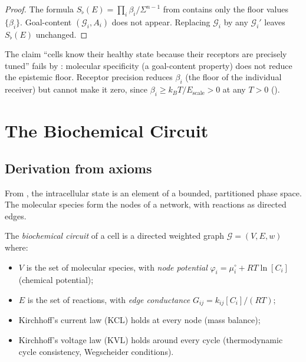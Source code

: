 \documentclass[twocolumn,11pt,a4paper]{article}
\newcommand{\Sfloor}{S_{\flat}}
\newcommand{\Gcond}{\mathcal{G}}
\begin{document}
\begin{proof}
The formula $\Sfloor(E) = \prod_i \beta_i / \Sigma^{n-1}$ from
 contains only the floor values $\{\beta_i\}$.
Goal-content $(\mathcal{G}_i, A_i)$ does not appear. Replacing
$\mathcal{G}_i$ by any $\mathcal{G}_i'$ leaves $\Sfloor(E)$ unchanged.
\end{proof}

\begin{corollary}\label{cor:no-specificity}
The claim ``cells know their healthy state because their receptors are
precisely tuned'' fails by : molecular specificity (a
goal-content property) does not reduce the epistemic floor. Receptor
precision reduces $\beta_i$ (the floor of the individual receiver) but
cannot make it zero, since $\beta_i \geq k_BT / E_{\mathrm{scale}} > 0$
at any $T > 0$ ().
\end{corollary}

\section{The Biochemical Circuit}
\label{sec:circuit}

\subsection{Derivation from axioms}

From , the intracellular state is an element of a
bounded, partitioned phase space. The molecular species form the nodes of a
network, with reactions as directed edges.

\begin{definition}\label{def:circuit}
The \emph{biochemical circuit} of a cell is a directed weighted graph
$\Gcond = (V, E, w)$ where:
\begin{itemize}[leftmargin=*,nosep]
\item $V$ is the set of molecular species, with
      \emph{node potential}
      $\varphi_i = \mu_i^\circ + RT\ln[C_i]$ (chemical potential);
\item $E$ is the set of reactions, with
      \emph{edge conductance}
      $G_{ij} = k_{ij}[C_i]/(RT)$;
\item Kirchhoff's current law (KCL) holds at every node (mass balance);
\item Kirchhoff's voltage law (KVL) holds around every cycle
      (thermodynamic cycle consistency, Wegscheider conditions).
\end{itemize}
\end{definition}
\end{document}
